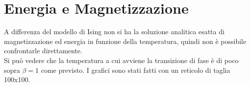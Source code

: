 \section{Energia e Magnetizzazione}
A differenza del modello di Ising non si ha la soluzione analitica esatta di magnetizzazione ed energia in funzione della temperatura, quindi non è possibile confrontarle direttamente.\\
Si può vedere che la temperatura a cui avviene la transizione di fase è di poco sopra $\beta=1$ come previsto. I grafici sono stati fatti con un reticolo di taglia 100x100.
\begin{center}
\begin{figure}[h]

\end{figure}
\end{center}
